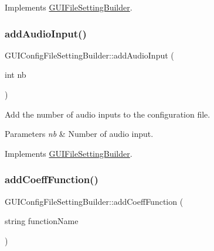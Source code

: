 Implements \mbox{\hyperlink{class_g_u_i_file_setting_builder_ac219ca2fecb545689b3e06857d77be73}{G\+U\+I\+File\+Setting\+Builder}}.

\mbox{\label{class_g_u_i_config_file_setting_builder_adedbf3183bfae8c718f22ea704ac3074}} 
\subsubsection{\texorpdfstring{add\+Audio\+Input()}{addAudioInput()}}
{\footnotesize\ttfamily G\+U\+I\+Config\+File\+Setting\+Builder\+::add\+Audio\+Input (\begin{DoxyParamCaption}\item[{int}]{nb }\end{DoxyParamCaption})\hspace{0.3cm}{\ttfamily [virtual]}}



Add the number of audio inputs to the configuration file. 


\begin{DoxyParams}{Parameters}
{\em nb} & Number of audio input. \\
\hline
\end{DoxyParams}


Implements \mbox{\hyperlink{class_g_u_i_file_setting_builder_adf0f3d72bbc03dd11d4914410e6bee3b}{G\+U\+I\+File\+Setting\+Builder}}.

\mbox{\label{class_g_u_i_config_file_setting_builder_a66c807146e8d76be96b8ad2c5088779f}} 
\subsubsection{\texorpdfstring{add\+Coeff\+Function()}{addCoeffFunction()}}
{\footnotesize\ttfamily G\+U\+I\+Config\+File\+Setting\+Builder\+::add\+Coeff\+Function (\begin{DoxyParamCaption}\item[{string}]{function\+Name }\end{DoxyParamCaption})\hspace{0.3cm}{\ttfamily [virtual]}}



